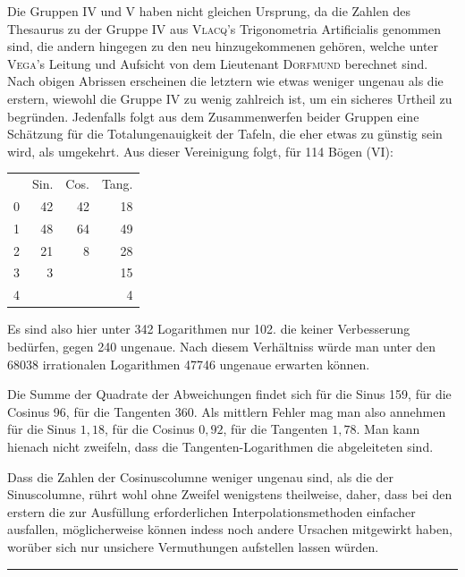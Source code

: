 Die Gruppen IV und V haben nicht gleichen Ursprung, da die Zahlen des Thesaurus zu der Gruppe IV aus \textsc{Vlacq}'s Trigonometria Artificialis genommen sind, die andern hingegen zu den neu hinzugekommenen gehören, welche unter \textsc{Vega}'s Leitung und Aufsicht von dem Lieutenant \textsc{Dorfmund} berechnet sind. Nach obigen Abrissen erscheinen die letztern wie etwas weniger ungenau als die erstern, wiewohl die Gruppe IV zu wenig zahlreich ist, um ein sicheres Urtheil zu begründen. Jedenfalls folgt aus dem Zusammenwerfen beider Gruppen eine Schätzung
für die Totalungenauigkeit der Tafeln, die eher etwas zu günstig sein wird, als umgekehrt. Aus dieser Vereinigung folgt, für 114 Bögen (VI):
\begin{center}\begin{tabular}{r r r r}
& Sin. & Cos. & Tang.\\
0&42&42&18\\
1&48&64&49\\
2&21&8&28\\
3&3&&15\\
4&&&4
\end{tabular}\end{center}
Es sind also hier unter 342 Logarithmen nur 102. die keiner Verbesserung bedürfen, gegen 240 ungenaue. Nach diesem Verhältniss würde man unter den 68038 irrationalen Logarithmen 47746 ungenaue erwarten können.

Die Summe der Quadrate der Abweichungen findet sich für die Sinus 159, für die Cosinus 96, für die Tangenten 360. Als mittlern Fehler mag man also annehmen für die Sinus $1{,}18$, für die Cosinus $0{,}92$, für die Tangenten $1{,}78$. Man kann hienach nicht zweifeln, dass die Tangenten-Logarithmen die abgeleiteten sind.

\begin{samepage}
Dass die Zahlen der Cosinuscolumne weniger ungenau sind, als die der Sinuscolumne, rührt wohl ohne Zweifel wenigstens theilweise, daher, dass bei den erstern die zur Ausfüllung erforderlichen Interpolationsmethoden einfacher ausfallen, möglicherweise können indess noch andere Ursachen mitgewirkt haben, worüber sich nur unsichere Vermuthungen aufstellen lassen würden.
\begin{center}\bigskip\rule{.3\linewidth}{.4pt}\end{center}
\end{samepage}

